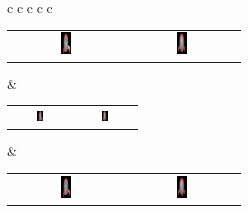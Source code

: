 \begin{figure}[!htb]
\begin{tabular*}{\textwidth}{ c c c c c }
        
        \setlength\tabcolsep{0pt}
        \begin{tabular}{cc}
            \includegraphics[width=0.095\textwidth]{figures/results/col_set/rocket0_targ_256px.png} & \includegraphics[width=0.095\textwidth]{figures/results/col_set/rocket4_targ_256px.png}
        \end{tabular}
        &
        \setlength\tabcolsep{0pt}
        \begin{tabular}{cc}
            \includegraphics[width=0.095\textwidth]{figures/results/col_set/rocket0_imnf_138k.png} & \includegraphics[width=0.095\textwidth]{figures/results/col_set/rocket4_imnf_138k.png}
        \end{tabular}
        &
        \setlength\tabcolsep{0pt}
        \begin{tabular}{cc}
            \includegraphics[width=0.095\textwidth]{figures/results/col_set/rocket0_excol_150k.png} & \includegraphics[width=0.095\textwidth]{figures/results/col_set/rocket4_excol_150k.png}

\end{tabular}
\end{tabular*}
\end{figure}
